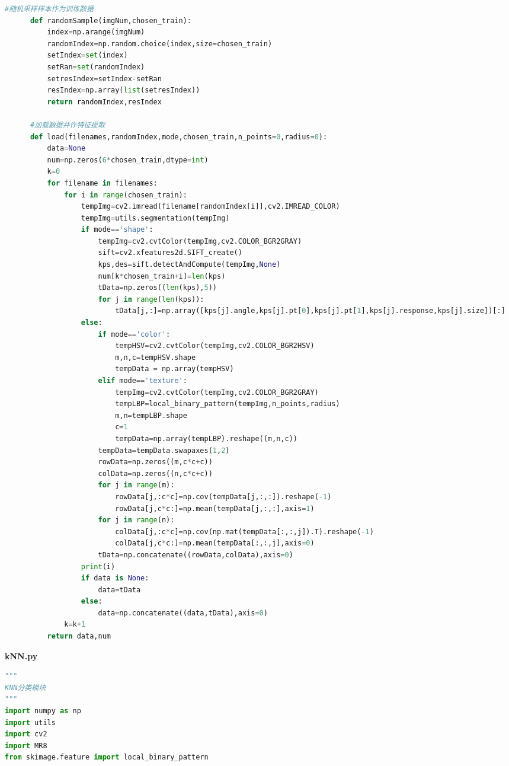 \documentclass[supercite]{HustGraduPaper}
\begin{document}
\begin{sloppypar}
\begin{appendices}
\begin{spacing}{1.25}
\begin{lstlisting}[language=python]
      #随机采样样本作为训练数据
      def randomSample(imgNum,chosen_train):
          index=np.arange(imgNum)
          randomIndex=np.random.choice(index,size=chosen_train)
          setIndex=set(index)
          setRan=set(randomIndex)
          setresIndex=setIndex-setRan
          resIndex=np.array(list(setresIndex))
          return randomIndex,resIndex
      
      #加载数据并作特征提取
      def load(filenames,randomIndex,mode,chosen_train,n_points=0,radius=0):
          data=None
          num=np.zeros(6*chosen_train,dtype=int)
          k=0
          for filename in filenames:
              for i in range(chosen_train):
                  tempImg=cv2.imread(filename[randomIndex[i]],cv2.IMREAD_COLOR)
                  tempImg=utils.segmentation(tempImg)
                  if mode=='shape':
                      tempImg=cv2.cvtColor(tempImg,cv2.COLOR_BGR2GRAY)
                      sift=cv2.xfeatures2d.SIFT_create()
                      kps,des=sift.detectAndCompute(tempImg,None)
                      num[k*chosen_train+i]=len(kps)
                      tData=np.zeros((len(kps),5))
                      for j in range(len(kps)):
                          tData[j,:]=np.array([kps[j].angle,kps[j].pt[0],kps[j].pt[1],kps[j].response,kps[j].size])[:]
                  else:
                      if mode=='color':
                          tempHSV=cv2.cvtColor(tempImg,cv2.COLOR_BGR2HSV)
                          m,n,c=tempHSV.shape
                          tempData = np.array(tempHSV)
                      elif mode=='texture':
                          tempImg=cv2.cvtColor(tempImg,cv2.COLOR_BGR2GRAY)
                          tempLBP=local_binary_pattern(tempImg,n_points,radius)
                          m,n=tempLBP.shape
                          c=1
                          tempData=np.array(tempLBP).reshape((m,n,c))
                      tempData=tempData.swapaxes(1,2)
                      rowData=np.zeros((m,c*c+c))
                      colData=np.zeros((n,c*c+c))
                      for j in range(m):
                          rowData[j,:c*c]=np.cov(tempData[j,:,:]).reshape(-1)
                          rowData[j,c*c:]=np.mean(tempData[j,:,:],axis=1)
                      for j in range(n):
                          colData[j,:c*c]=np.cov(np.mat(tempData[:,:,j]).T).reshape(-1)
                          colData[j,c*c:]=np.mean(tempData[:,:,j],axis=0)
                      tData=np.concatenate((rowData,colData),axis=0)
                  print(i)
                  if data is None:
                      data=tData
                  else:
                      data=np.concatenate((data,tData),axis=0)
              k=k+1
          return data,num
    \end{lstlisting}
    \end{spacing}
    \textbf{kNN.py}
    \begin{spacing}{1.25}
    \begin{lstlisting}[language=python]
      """
KNN分类模块
"""
import numpy as np
import utils
import cv2
import MR8
from skimage.feature import local_binary_pattern


\end{lstlisting}
\end{spacing}
\end{appendices}
\end{sloppypar}
\end{document}
